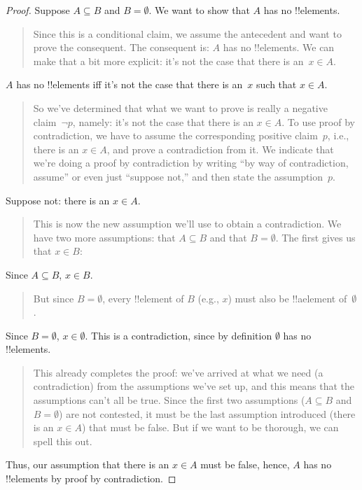 \documentclass[../../../include/open-logic-section]{subfiles}
\begin{document}
\begin{proof}
  Suppose $A \subseteq B$ and $B = \emptyset$. We want to show that
  $A$ has no !!{element}s.
  \begin{quote}
    Since this is a conditional claim, we assume the antecedent and
    want to prove the consequent. The consequent is: $A$ has no
    !!{element}s. We can make that a bit more explicit: it's not the
    case that there is an~$x \in A$.
  \end{quote}
  $A$ has no !!{element}s iff it's not the case that there is an~$x$
  such that $x \in A$.
  \begin{quote}
    So we've determined that what we want to prove is really a
    negative claim~$\lnot p$, namely: it's not the case that there is
    an $x \in A$.  To use proof by contradiction, we have to assume the
    corresponding positive claim~$p$, i.e., there is an $x \in A$, and
    prove a contradiction from it.  We indicate that we're doing a
    proof by contradiction by writing ``by way
    of contradiction, assume'' or even just ``suppose not,'' and then state
    the assumption~$p$.
  \end{quote}
  Suppose not: there is an $x \in A$.
  \begin{quote}
    This is now the new assumption we'll use to obtain a
    contradiction. We have two more assumptions: that $A \subseteq B$
    and that $B = \emptyset$. The first gives us that $x \in B$:
  \end{quote}
  Since $A \subseteq B$, $x \in B$.
  \begin{quote}
    But since $B = \emptyset$, every !!{element} of $B$ (e.g., $x$)
    must also be !!a{element} of~$\emptyset$.
  \end{quote}
  Since $B = \emptyset$, $x \in \emptyset$. This is a contradiction,
  since by definition $\emptyset$ has no !!{element}s.
  \begin{quote}
    This already completes the proof: we've arrived at what we need (a
    contradiction) from the assumptions we've set up, and this means
    that the assumptions can't all be true. Since the first two
    assumptions ($A \subseteq B$ and $B = \emptyset$) are not
    contested, it must be the last assumption introduced (there is an
    $x \in A$) that must be false. But if we want to be thorough, we
    can spell this out.
  \end{quote}
  Thus, our assumption that there is an $x \in A$ must be false, hence,
  $A$ has no !!{element}s by proof by contradiction.
\end{proof}
\end{document}
